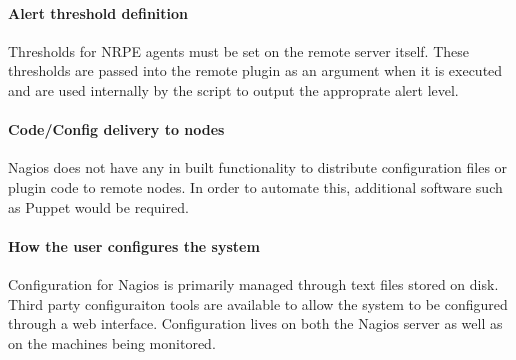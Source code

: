 \documentclass[10pt]{article}
\begin{document}
	\paragraph{Alert threshold definition}
	Thresholds for NRPE agents must be set on the remote server itself.  These thresholds are passed
	into the remote plugin as an argument when it is executed and are used internally by the script to
	output the approprate alert level.
	
	\paragraph{Code/Config delivery to nodes}
	Nagios does not have any in built functionality to distribute configuration files or plugin code to
	remote nodes. In order to automate this, additional software such as Puppet would be required.
	
	\paragraph{How the user configures the system}
	Configuration for Nagios is primarily managed through text files stored on disk.  Third party
	configuraiton tools are available to allow the system to be configured through a web interface.
	Configuration lives on both the Nagios server as well as on the machines being monitored.	
\end{document}

